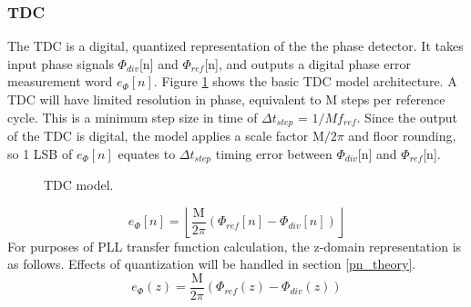\subsubsection{TDC}
The TDC is a digital, quantized representation of the the phase detector. It takes input phase signals $\Phi_{div}$[n] and $\Phi_{ref}$[n], and outputs a digital phase error measurement word $e_\Phi[n]$. Figure \ref{fig:tdc} shows the basic TDC model architecture. A TDC will have limited resolution in phase, equivalent to M steps per reference cycle. This is a minimum step size in time of $\Delta t_{step}$ = $1/Mf_{ref}$. Since the output of the TDC is digital, the model applies a scale factor M$/2\pi$ and floor rounding, so 1 LSB of $e_\Phi[n]$ equates to $\Delta t_{step}$ timing error  between $\Phi_{div}$[n] and $\Phi_{ref}$[n].
\begin{figure}[htb!]
	\center
	\caption{TDC model.}
	\label{fig:tdc}
\end{figure}
\begin{equation}
	e_\Phi[n] = \left\lfloor\frac{\mathrm{M}}{2\pi}(\Phi_{ref}[n] - \Phi_{div}[n])\right\rfloor
\end{equation}
For purposes of PLL transfer function calculation, the z-domain representation is as follows. Effects of quantization will be handled in section \ref{pn_theory}.
\begin{equation}
	e_\Phi(z) = \frac{\mathrm{M}}{2\pi}(\Phi_{ref}(z) - \Phi_{div}(z))
\end{equation}	
\FloatBarrier
